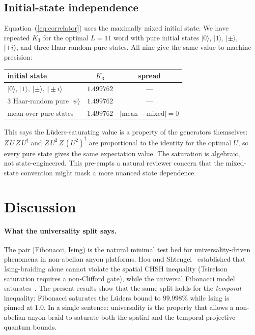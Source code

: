 \documentclass[aps,prx,reprint,amsmath,amssymb,floatfix,nofootinbib,superscriptaddress]{revtex4-2}
\begin{document}
\subsection{Initial-state independence}

Equation~(\ref{eq:correlator}) uses the maximally mixed initial state.
We have repeated $K_{3}$ for the optimal $L=11$ word with pure initial
states $|0\rangle$, $|1\rangle$, $|\pm\rangle$, $|\pm i\rangle$, and
three Haar-random pure states. All nine give the same value to
machine precision:
\begin{center}\small
\begin{tabular}{lcc}
\toprule
initial state & $K_{3}$ & spread \\
\midrule
$|0\rangle,\ |1\rangle,\ |\pm\rangle,\ |\pm i\rangle$
              & $1.499762$ & --- \\
$3$ Haar-random pure $|\psi\rangle$
              & $1.499762$ & --- \\
\midrule
mean over pure states & $1.499762$ &
        $|\text{mean}-\text{mixed}| = 0$ \\
\bottomrule
\end{tabular}
\end{center}
This says the L\"uders-saturating value is a property of the
generators themselves: $Z\,U\,Z\,U^{\dagger}$ and $Z\,U^{2}\,Z\,(U^{2})^{\dagger}$
are proportional to the identity for the optimal $U$, so every pure
state gives the same expectation value. The saturation is algebraic,
not state-engineered. This pre-empts a natural reviewer concern that
the mixed-state convention might mask a more nuanced state dependence.

\section{Discussion}
\label{sec:discussion}

\paragraph{What the universality split says.}
The pair (Fibonacci, Ising) is the natural minimal test bed for
universality-driven phenomena in non-abelian anyon platforms.
Hou and Shtengel~\cite{HouShtengel2016} established that
Ising-braiding alone cannot violate the spatial CHSH inequality
(Tsirelson saturation requires a non-Clifford gate), while the
universal Fibonacci model
saturates~\cite{Brennen2009,NayakSimonStern2008}. The present results
show that the same split holds for the \emph{temporal} inequality:
Fibonacci saturates the L\"uders bound to $99.998\%$ while Ising is
pinned at $1.0$. In a single sentence: universality is the property
that allows a non-abelian anyon braid to saturate both the spatial
and the temporal projective-quantum bounds.
\end{document}
